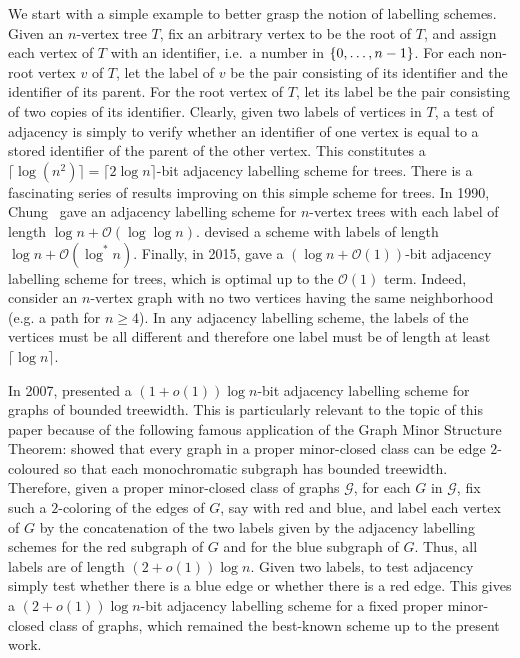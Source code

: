\documentclass{patmorin}
\renewcommand{\geq}{\geqslant}
\newcommand{\vida}[1]{{\color{pink} VD: #1}}
\newcommand{\pat}[1]{\textcolor{Magenta}{PaMo: #1}}
\newcommand{\calG}{\mathcal{G}}
\newcommand{\Oh}{\mathcal{O}}
\DeclarePairedDelimiter{\set}{\{}{\}}
\begin{document}
We start with a simple example to better grasp the notion of labelling schemes.
Given an $n$-vertex tree $T$, fix an arbitrary vertex to be the root of $T$, and assign each vertex of $T$ with an identifier, i.e.\ a number in $\set{0,\ldots,n-1}$.
For each non-root vertex $v$ of $T$,
let the label of $v$ be
the pair consisting of its identifier and the identifier of its parent.
For the root vertex of $T$, let its label be
the pair consisting of two copies of its identifier.
Clearly, given two labels of vertices in $T$,
a test of adjacency is simply to verify whether an identifier of one vertex is equal to a stored identifier of the parent of the other vertex.
This constitutes a $\lceil\log(n^2)\rceil=\lceil2\log n\rceil$-bit adjacency labelling scheme for trees.
There is a fascinating series of results improving on this simple scheme for trees. In 1990, Chung~\cite{chung:universal} gave an adjacency labelling scheme for $n$-vertex trees with each label of length $\log n +\Oh(\log\log n)$.
\citet{alstrup.rauhe:improved} devised a scheme with labels of length $\log n+\Oh(\log^*n)$.
Finally, in 2015,
\citet{alstrup.dahlgaard.ea:optimal} gave a $(\log n + \Oh(1))$-bit adjacency labelling scheme for trees, which is optimal up to the $\Oh(1)$ term.
Indeed, consider an $n$-vertex graph with no two vertices having the same neighborhood (e.g. a path for $n\geq4$).
In any adjacency labelling scheme,
the labels of the vertices must be all different and therefore one label must be of length at least $\lceil\log n\rceil$.


In 2007, \citet{gavoille.labourel:shorter} presented
a $(1+o(1))\log n$-bit adjacency labelling scheme for graphs of bounded treewidth.
This is particularly relevant to the topic of this paper because of the following famous application of the Graph Minor Structure Theorem:
\citet{devos2004} showed that every graph
in a proper minor-closed class can be edge $2$-coloured so that each monochromatic subgraph
has bounded treewidth.
Therefore, given a proper minor-closed class of graphs $\calG$,
for each $G$ in $\calG$, fix such a $2$-coloring of the edges of $G$, say with red and blue, and label each vertex of $G$ by the concatenation of the two labels given by the adjacency labelling schemes for the red subgraph of $G$ and for the blue subgraph of $G$. Thus, all labels are of length $(2+o(1))\log n$.
Given two labels, to test adjacency simply test whether there is a blue edge or whether there is a red edge.
This gives a $(2+o(1))\log n$-bit adjacency labelling scheme for a fixed proper minor-closed class of graphs, which remained the best-known scheme up to the present work.
\end{document}
